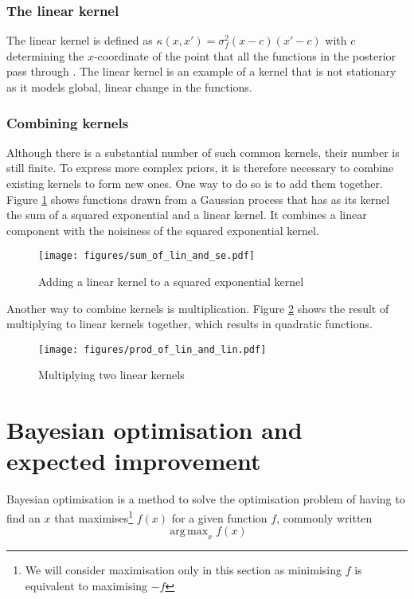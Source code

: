 \documentclass[a4paper,12pt,twoside,openright]{report}
\DeclareMathOperator*{\argmax}{arg\,max}
\begin{document}
\subsubsection{The linear kernel}
The linear kernel is defined as $\kappa(x, x') = \sigma_f^2(x-c)(x'-c)$ with $c$ determining the $x$-coordinate of the point that all the functions in the posterior pass through \cite{duvenaudthesis}. The linear kernel is an example of a kernel that is not stationary as it models global, linear change in the functions.


\subsubsection{Combining kernels}
Although there is a substantial number of such common kernels, their number is still finite. To express more complex priors, it is therefore necessary to combine existing kernels to form new ones. One way to do so is to add them together. Figure \ref{sum_of_lin_and_se} shows functions drawn from a Gaussian process that has as its kernel the sum of a squared exponential and a linear kernel. It combines a linear component with the noisiness of the squared exponential kernel.

\begin{figure}
\centering
  \texttt{[image: figures/sum\_of\_lin\_and\_se.pdf]}
  \caption{Adding a linear kernel to a squared exponential kernel}
  \label{sum_of_lin_and_se}
\end{figure}

Another way to combine kernels is multiplication. Figure \ref{prod_of_lin_and_lin} shows the result of multiplying to linear kernels together, which results in quadratic functions.

\begin{figure}
\centering
  \texttt{[image: figures/prod\_of\_lin\_and\_lin.pdf]}
  \caption{Multiplying two linear kernels}
  \label{prod_of_lin_and_lin}
\end{figure}



\section{Bayesian optimisation and expected improvement}

Bayesian optimisation is a method to solve the optimisation problem of having to find an $x$ that maximises\footnote{We will consider maximisation only in this section as minimising $f$ is equivalent to maximising $-f$} $f(x)$ for a given function $f$, commonly written 
\begin{equation}
\argmax_x f(x)
\end{equation}
\end{document}

